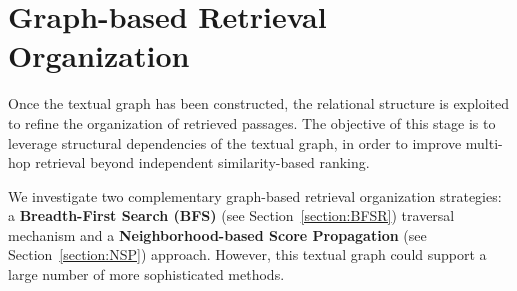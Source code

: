 \documentclass[11pt]{article}
\begin{document}

\section{Graph-based Retrieval Organization}
\label{section:BFSRO}
Once the textual graph has been constructed, the relational structure is exploited to refine the organization of retrieved passages. The objective of this stage is to leverage structural dependencies of the textual graph, in order to improve multi-hop retrieval beyond independent similarity-based ranking.

We investigate two complementary graph-based retrieval organization strategies: a \textbf{Breadth-First Search (BFS)} (see Section~\ref{section:BFSR}) traversal mechanism and a \textbf{Neighborhood-based Score Propagation} (see Section~\ref{section:NSP}) approach. However, this textual graph could support a large number of more sophisticated methods. 
\end{document}
